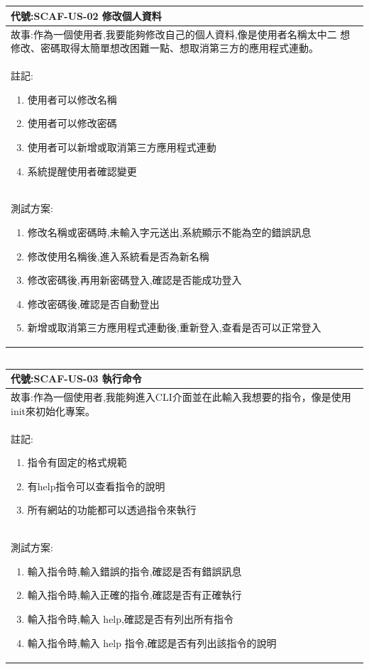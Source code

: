 \documentclass{report}
\begin{document}
\subsection*{}
\fontsize{12}{20}\selectfont
\begin{tabularx}{\textwidth}{|X|}
  \hline
  代號:SCAF-US-02 修改個人資料 \\
  \hline
  故事:作為一個使用者,我要能夠修改自己的個人資料,像是使用者名稱太中二
想修改、密碼取得太簡單想改困難一點、想取消第三方的應用程式連動。 \\
  \hline
  註記:
  \begin{enumerate}
    \item 使用者可以修改名稱
    \item 使用者可以修改密碼
    \item 使用者可以新增或取消第三方應用程式連動
    \item 系統提醒使用者確認變更
  \end{enumerate} \\
  \hline
  測試方案:
  \begin{enumerate}
    \item 修改名稱或密碼時,未輸入字元送出,系統顯示不能為空的錯誤訊息
    \item 修改使用名稱後,進入系統看是否為新名稱
    \item 修改密碼後,再用新密碼登入,確認是否能成功登入
    \item 修改密碼後,確認是否自動登出
    \item 新增或取消第三方應用程式連動後,重新登入,查看是否可以正常登入
  \end{enumerate} \\
  \hline
\end{tabularx}

\subsection*{}
\fontsize{12}{20}\selectfont
\begin{tabularx}{\textwidth}{|X|}
  \hline
  代號:SCAF-US-03 執行命令 \\
  \hline
  故事:作為一個使用者,我能夠進入CLI介面並在此輸入我想要的指令，像是使用init來初始化專案。 \\
  \hline
  註記:
  \begin{enumerate}
    \item 指令有固定的格式規範
    \item 有help指令可以查看指令的說明
    \item 所有網站的功能都可以透過指令來執行
  \end{enumerate} \\
  \hline
  測試方案:
  \begin{enumerate}
    \item 輸入指令時,輸入錯誤的指令,確認是否有錯誤訊息
    \item 輸入指令時,輸入正確的指令,確認是否有正確執行
    \item 輸入指令時,輸入 help,確認是否有列出所有指令
    \item 輸入指令時,輸入 help 指令,確認是否有列出該指令的說明
  \end{enumerate} \\
  \hline
\end{tabularx}
\end{document}
